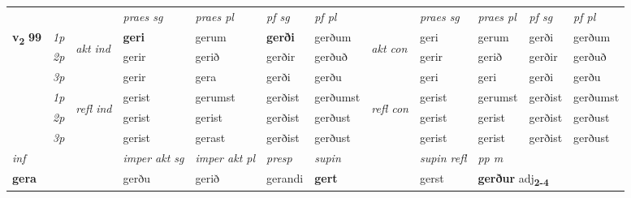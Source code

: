 \begin{longtable}[l]{X>{\footnotesize\itshape}llXXXXlXXXX}
 & &   & \textit{praes sg}  & \textit{praes pl}    & \textit{ pf sg} & \textit{pf pl} & & \textit{praes sg}  & \textit{praes pl}    & \textit{pf sg} & \textit{pf pl }  \\ \cmidrule{4-7} \cmidrule{9-12}
 \multirow{2}{*}{{{\textbf{v{\textsubscript{2}}} \Large{\textbf{99}}}}}  & 1p & \multirow{3}{*}{\begin{turn}{90}\textit{akt ind}\end{turn}} & \textbf{geri} & gerum & \textbf{gerði} & gerðum & \multirow{3}{*}{\begin{turn}{90}\textit{akt con}\end{turn}} &geri & gerum & gerði & gerðum\\*
 & 2p &  &  gerir  & gerið & gerðir & gerðuð & & gerir & gerið & gerðir & gerðuð \\*
 & 3p &  & gerir & gera & gerði & gerðu & & geri & geri& gerði & gerðu \\*
\cmidrule{4-7} \cmidrule{9-12}
 & 1p & \multirow{3}{*}{\begin{turn}{90}\textit{refl ind}\end{turn}}  & gerist & gerumst & gerðist & gerðumst & \multirow{3}{*}{\begin{turn}{90}\textit{refl con}\end{turn}}  &gerist & gerumst & gerðist & gerðumst \\*
 & 2p &  & gerist & gerist & gerðist & gerðust & &gerist & gerist & gerðist & gerðust \\*
 & 3p  & & gerist & gerast & gerðist & gerðust & & gerist & gerist& gerðist & gerðust \\*
\cmidrule{4-7} \cmidrule{9-12}

 {\textit{inf}} & &  & \textit{imper akt sg} & \textit{imper akt pl}   & \textit{presp} & \textit{supin} && \textit{supin refl} & \textit{pp m} \\*
 {\textbf{gera}} & && gerðu  & gerið   & gerandi &  \textbf{gert} && gerst & \multicolumn{2}{l}{\textbf{gerður} adj\textbf{\textsubscript{2-4}}} \\*
\midrule


\end{longtable}
